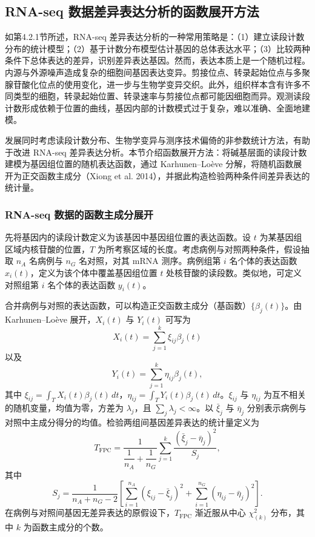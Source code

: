 \subsection{RNA-seq 数据差异表达分析的函数展开方法}

如第4.2.1节所述，RNA-seq 差异表达分析的一种常用策略是：（1）建立读段计数分布的统计模型；（2）基于计数分布模型估计基因的总体表达水平；（3）比较两种条件下总体表达的差异，识别差异表达基因。然而，表达本质上是一个随机过程。内源与外源噪声造成复杂的细胞间基因表达变异。剪接位点、转录起始位点与多聚腺苷酸化位点的使用变化，进一步与生物学变异交织。此外，组织样本含有许多不同类型的细胞，转录起始位置、转录速率与剪接位点都可能因细胞而异。观测读段计数形成依赖于位置的曲线，基因内部的计数模式过于复杂，难以准确、全面地建模。

发展同时考虑读段计数分布、生物学变异与测序技术偏倚的非参数统计方法，有助于改进 RNA-seq 差异表达分析。本节介绍函数展开方法：将碱基层面的读段计数建模为基因组位置的随机表达函数，通过 Karhunen–Loève 分解，将随机函数展开为正交函数主成分（Xiong et al. 2014），并据此构造检验两种条件间差异表达的统计量。

\subsubsection{RNA-seq 数据的函数主成分展开}
先将基因内的读段计数定义为该基因中基因组位置的表达函数。设 $t$ 为某基因组区域内核苷酸的位置，$T$ 为所考察区域的长度。考虑病例与对照两种条件，假设抽取 $n_A$ 名病例与 $n_G$ 名对照，对其 mRNA 测序。病例组第 $i$ 名个体的表达函数 $x_i(t)$，定义为该个体中覆盖基因组位置 $t$ 处核苷酸的读段数。类似地，可定义对照组第 $i$ 名个体的表达函数 $y_i(t)$。

合并病例与对照的表达函数，可以构造正交函数主成分（基函数）$\{\beta_j(t)\}$。由 Karhunen–Loève 展开，$X_i(t)$ 与 $Y_i(t)$ 可写为
\begin{equation}
X_i(t)=\sum_{j=1}^{k}\xi_{ij}\beta_j(t)
\tag{4.109}
\end{equation}
以及
\begin{equation}
Y_i(t)=\sum_{j=1}^{k}\eta_{ij}\beta_j(t),
\tag{4.110}
\end{equation}
其中 $\xi_{ij}=\int_T X_i(t)\beta_j(t)\,dt$，$\eta_{ij}=\int_T Y_i(t)\beta_j(t)\,dt$。$\xi_{ij}$ 与 $\eta_{ij}$ 为互不相关的随机变量，均值为零，方差为 $\lambda_j$，且 $\sum_j\lambda_j<\infty$。以 $\bar\xi_j$ 与 $\bar\eta_j$ 分别表示病例与对照中主成分得分的均值。检验两组间基因差异表达的统计量定义为
\begin{equation}
T_{\mathrm{FPC}}=\frac1{\dfrac1{n_A}+\dfrac1{n_G}}
\sum_{j=1}^{k}\frac{(\bar\xi_j-\bar\eta_j)^2}{S_j},
\tag{4.111}
\end{equation}
其中
\[
S_j=\frac1{n_A+n_G-2}\left[\sum_{i=1}^{n_A}(\xi_{ij}-\bar\xi_j)^2
+\sum_{i=1}^{n_G}(\eta_{ij}-\bar\eta_j)^2\right].
\]
在病例与对照间基因无差异表达的原假设下，$T_{\mathrm{FPC}}$ 渐近服从中心 $\chi^2_{(k)}$ 分布，其中 $k$ 为函数主成分的个数。

